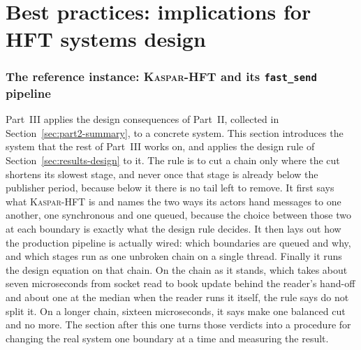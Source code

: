 \documentclass[11pt]{article}
\newcommand{\kasparhft}{\textsc{Kaspar-HFT}}
\begin{document}
\part{Best practices: implications for HFT systems design}

\section{The reference instance: \kasparhft{} and its \texttt{fast\_send} pipeline}
\label{sec:kaspar}

Part~III applies the design consequences of Part~II, collected in
Section~\ref{sec:part2-summary}, to a concrete system. This section introduces the system that the rest of Part~III works on, and applies the
design rule of Section~\ref{sec:results-design} to it. The rule is to cut a chain only
where the cut shortens its slowest stage, and never once that stage is already below the
publisher period, because below it there is no tail left to remove. It first says what \kasparhft{} is and names the two ways its
actors hand messages to one another, one synchronous and one queued, because the choice
between those two at each boundary is exactly what the design rule decides. It then lays
out how the production pipeline is actually wired: which boundaries are queued and why,
and which stages run as one unbroken chain on a single thread. Finally it runs the design
equation on that chain. On the chain as it stands, which takes about seven microseconds
from socket read to book update behind the reader's hand-off and about one at the median
when the reader runs it itself, the rule says do not split it. On a longer chain, sixteen microseconds, it says make one balanced
cut and no more. The section after this one turns those verdicts into a procedure for
changing the real system one boundary at a time and measuring the result.
\end{document}
